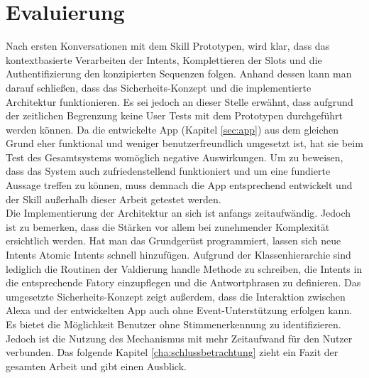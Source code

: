 \section{Evaluierung}
\label{sec:evaluierung}
Nach ersten Konversationen mit dem Skill Prototypen, wird klar, dass das kontextbasierte Verarbeiten der Intents, Komplettieren der Slots und die Authentifizierung den konzipierten Sequenzen folgen. Anhand dessen kann man darauf schließen, dass das Sicherheits-Konzept und die implementierte Architektur funktionieren. Es sei jedoch an dieser Stelle erwähnt, dass aufgrund der zeitlichen Begrenzung keine User Tests mit dem Prototypen durchgeführt werden können. Da die entwickelte App (Kapitel \ref{sec:app}) aus dem gleichen Grund eher funktional und weniger benutzerfreundlich umgesetzt ist, hat sie beim Test des Gesamtsystems womöglich negative Auswirkungen. Um zu beweisen, dass das System auch zufriedenstellend funktioniert und um eine fundierte Aussage treffen zu können, muss demnach die App entsprechend entwickelt und der Skill außerhalb dieser Arbeit getestet werden.\\ 
Die Implementierung der Architektur an sich ist anfangs zeitaufwändig. Jedoch ist zu bemerken, dass die Stärken vor allem bei zunehmender Komplexität ersichtlich werden. Hat man das Grundgerüst programmiert, lassen sich neue Intents \bzw Atomic Intents schnell hinzufügen. Aufgrund der Klassenhierarchie sind lediglich die Routinen der Valdierung \bzw handle Methode zu schreiben, die Intents in die entsprechende Fatory einzupflegen und die Antwortphrasen zu definieren. Das umgesetzte Sicherheits-Konzept zeigt außerdem, dass die Interaktion zwischen Alexa und der entwickelten App auch ohne Event-Unterstützung erfolgen kann. Es bietet die Möglichkeit Benutzer ohne Stimmenerkennung zu identifizieren. Jedoch ist die Nutzung des Mechanismus mit mehr Zeitaufwand für den Nutzer verbunden. Das folgende Kapitel \ref{cha:schlussbetrachtung} zieht ein Fazit der gesamten Arbeit und gibt einen Ausblick.

